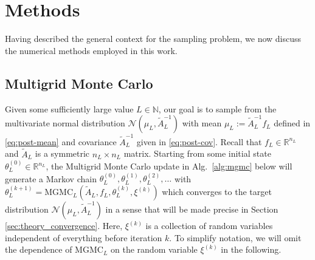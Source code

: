\documentclass[11pt,english]{article}
\theoremstyle{plain}
\theoremstyle{plain}
\theoremstyle{plain}
\theoremstyle{plain}
\numberwithin{equation}{section}
\newcommand{\jg}[1]{#1}
\begin{document}
\section{Methods}\label{sec:methods}
Having described the general context for the sampling problem, we now discuss the numerical methods employed in this work.
\subsection{Multigrid Monte Carlo}
Given some sufficiently large value $L \in \mathbb{N}$, our goal is to sample from the multivariate normal distribution $\mathcal{N}(\mu_L,\widetilde{A}_L^{-1})$ with mean $\mu_L:=\widetilde{A}_L^{-1}f_L$ defined in \eqref{eq:post-mean} and covariance $\widetilde{A}_{L}^{-1}$ given in \eqref{eq:post-cov}. Recall that $f_L\in\mathbb{R}^{n_L}$ and $\widetilde{A}_L$ is a symmetric $n_L \times n_L$ matrix. Starting from some initial state $\theta_{L}^{(0)} \in \mathbb{R}^{n_L}$, the Multigrid Monte Carlo update in Alg.~\ref{alg:mgmc} below will generate a Markov chain $\theta_{L}^{(0)},\theta_{L}^{(1)},\theta_{L}^{(2)},\dots$ with $\theta_{L}^{(k+1)}=\mathrm{MGMC}_L(\widetilde{A}_L,f_L,\theta_{L}^{(k)},\jg{\xi^{(k)}})$ which converges to the target distribution $\mathcal{N}(\mu_L,\widetilde{A}_L^{-1})$ in a sense that will be made precise in Section \ref{sec:theory_convergence}. \jg{Here,  $\xi^{(k)}$ is a collection of random variables independent of  everything before iteration $k$. To simplify notation, we will omit the dependence of $\mathrm{MGMC}_L$ on the random variable $\xi^{(k)}$ in the following.}
\end{document}
